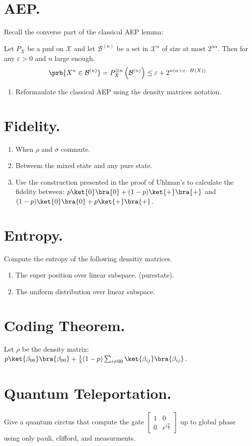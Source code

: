 \documentclass[12pt,a4paper]{article}
\begin{document}
\section{AEP.}
Recall the converse part of the classical AEP lemma: 
\begin{lemma}
  Let $P_X$ be a pmf on $\mathcal{X}$ and let $\mathcal{B}^{(n)}$ be a set in $\mathcal{X}^n$ of size at most $2^{n\alpha}$. Then for any $\varepsilon > 0$ and $n$ large enough. 
  \begin{equation*}
    \begin{split}
      \prb{X^n \in \mathcal{B}^{(n)}} = P^{\otimes n}_{X}\left( \mathcal{B}^{(n)} \right) \le \varepsilon + 2^{n(\alpha + \varepsilon - H(X))}
    \end{split}
  \end{equation*}
\end{lemma}
\begin{enumerate}
  \item Reformaulate the classical AEP using the density matrices notation. 
\end{enumerate}

\section{Fidelity.}
\begin{enumerate}
  \item When $\rho$ and $\sigma$ commute. 
  \item Betweem the mixed state and any pure state.  
  \item Use the construction presented in the proof of Uhlman's to calculate the fidelity between: $p\ket{0}\bra{0} + (1-p)\ket{+}\bra{+}$  and $(1-p)\ket{0}\bra{0} + p\ket{+}\bra{+}$. 
\end{enumerate}

\section{Entropy.}
Compute the entropy of the following densitiy matrices. 
\begin{enumerate}
  \item The super position over linear subspace. (purestate). 
  \item The uniform distribution over linear subspace.
   
\end{enumerate}


\section{Coding Theorem.} 
Let $\rho$ be the density matrix: $p \ket{\beta_{00}}\bra{\beta_{00}} + \frac{1}{3}(1-p)\sum_{i \neq 00}{\ket{\beta_{ij}}\bra{\beta_{ij}}}$.
\section{Quantum Teleportation.}
Give a quantum circtus that compute the gate $\begin{bmatrix} 1 & 0 \\ 0 &  e^{i\frac{\pi}{8}} \end{bmatrix} $ up to global phase using only pauli, clifford, and measurments. 

\printbibliography 
\end{document}
